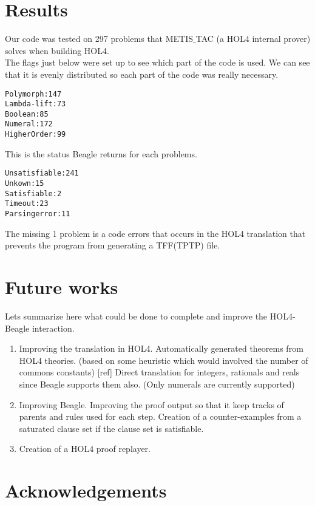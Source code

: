 \documentclass[a4paper, 11pt]{article}
\theoremstyle{plain}
\theoremstyle{definition}
\theoremstyle{remark}
\begin{document}
\section{Results}
Our code was tested on 297 problems that METIS$\_$TAC (a HOL4 internal prover) solves when building HOL4. 
\\The flags just below were set up to see which part of the code is used. We can see that it is evenly distributed so each part of the code was really necessary.
\begin{alltt}
Polymorph   : 147
Lambda-lift : 73
Boolean     : 85
Numeral     : 172
Higher Order: 99
\end{alltt}
This is the status Beagle returns for each problems. 
\begin{alltt}
Unsatisfiable : 241
Unkown        : 15
Satisfiable   : 2
Time out      : 23
Parsing error : 11
\end{alltt}
The missing 1 problem is a code errors that occurs in the HOL4 translation that prevents the program from generating a TFF(TPTP) file.

\section{Future works}
Lets summarize here what could be done to complete and improve the HOL4-Beagle interaction.
\begin{enumerate}
\item Improving the translation in HOL4.
 \subitem Automatically generated theorems from HOL4 theories. 
   (based on some heuristic which would involved the number of commons constants) [ref]
 \subitem Direct translation for integers, rationals and reals since Beagle supports them also. (Only numerals are currently supported)
\item Improving Beagle.
\subitem Improving the proof output so that it keep tracks of parents and rules used for each step.   
\subitem Creation of a counter-examples from a saturated clause set if the clause set is satisfiable.
\item Creation of a HOL4 proof replayer.
\end{enumerate}

\section{Acknowledgements}
\end{document}
